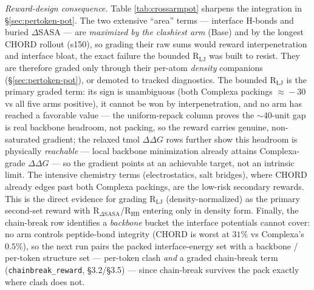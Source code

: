 \documentclass[11pt]{article}
\newcommand{\R}{\mathrm{R}}
\newcommand{\ttk}[1]{\texttt{\small #1}}
\begin{document}
\emph{Reward-design consequence.} Table \ref{tab:crossarmpot} sharpens the integration in
\S\ref{sec:pertoken-pot}. The two extensive ``area'' terms --- interface H-bonds and buried
$\Delta$SASA --- are \emph{maximized by the clashiest arm} (Base) and by the longest CHORD rollout
(s150), so grading their raw sums would reward interpenetration and interface bloat, the exact
failure the bounded $\R_{\mathrm{LJ}}$ was built to resist. They are therefore graded only through
their per-atom \emph{density} companions (\S\ref{sec:pertoken-pot}), or demoted to tracked
diagnostics. The bounded $\R_{\mathrm{LJ}}$ is the primary graded term: its sign is unambiguous
(both Complexa packings $\approx\!-30$ vs all five arms positive), it cannot be won by
interpenetration, and no arm has reached a favorable value --- the uniform-repack column proves the
$\sim\!40$-unit gap is real backbone headroom, not packing, so the reward carries genuine,
non-saturated gradient; the relaxed tmol $\Delta\Delta G$ rows further show this headroom is
physically \emph{reachable} --- local backbone minimization already attains Complexa-grade
$\Delta\Delta G$ --- so the gradient points at an achievable target, not an intrinsic limit. The
intensive chemistry terms (electrostatics, salt bridges), where CHORD
already edges past both Complexa packings, are the low-risk secondary rewards. This is the direct
evidence for grading $\R_{\mathrm{LJ}}$ (density-normalized) as the primary second-set reward with
$\R_{\Delta\mathrm{SASA}}$/$\R_{\mathrm{HB}}$ entering only in density form. Finally, the chain-break
row identifies a \emph{backbone} bucket the interface potentials cannot cover: no arm controls
peptide-bond integrity (CHORD is worst at $31\%$ vs Complexa's $0.5\%$), so the next run pairs the
packed interface-energy set with a backbone / per-token structure set --- per-token clash \emph{and}
a graded chain-break term (\ttk{chainbreak\_reward}, \S3.2/\S3.5) --- since chain-break survives the
pack exactly where clash does not.
\end{document}
